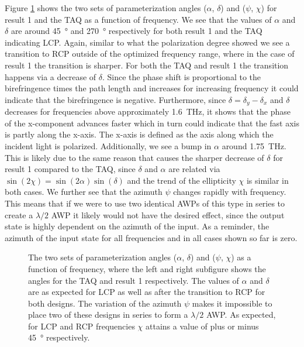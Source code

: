 Figure \ref{fig:cl4_params} shows the two sets of parameterization angles ($\alpha$, $\delta$) and ($\psi$, $\chi$) for result 1 and the TAQ as a function of frequency. We see that the values of $\alpha$ and $\delta$ are around \SI{45}{\degree} and \SI{270}{\degree} respectively for both result 1 and the TAQ indicating LCP. Again, similar to what the polarization degree showed we see a transition to RCP outside of the optimized frequency range, where in the case of result 1 the transition is sharper. For both the TAQ and result 1 the transition happens via a decrease of $\delta$. Since the phase shift is proportional to the birefringence times the path length and increases for increasing frequency it could indicate that the birefringence is negative. Furthermore, since $\delta = \delta_y - \delta_x$ and $\delta$ decreases for frequencies above approximately \SI{1.6}{\tera \hertz}, it shows that the phase of the x-component advances faster which in turn could indicate that the fast axis is partly along the x-axis. The x-axis is defined as the axis along which the incident light is polarized. Additionally, we see a bump in $\alpha$ around \SI{1.75}{\tera \hertz}. This is likely due to the same reason that causes the sharper decrease of $\delta$ for result 1 compared to the TAQ, since $\delta$ and $\alpha$ are related via $\sin(2\chi)=\sin(2\alpha)\sin(\delta)$ and the trend of the ellipticity $\chi$ is similar in both cases. We further see that the azimuth $\psi$ changes rapidly with frequency. This means that if we were to use two identical AWPs of this type in series to create a $\lambda/2$ AWP it likely would not have the desired effect, since the output state is highly dependent on the azimuth of the input. As a reminder, the azimuth of the input state for all frequencies and in all cases shown so far is zero.

\begin{figure}[ht]
    \centering
    
    \caption{The two sets of parameterization angles ($\alpha$, $\delta$) and ($\psi$, $\chi$) as a function of frequency, where the left and right subfigure shows the angles for the TAQ and result 1 respectively. The values of $\alpha$ and $\delta$ are as expected for LCP as well as after the transition to RCP for both designs. The variation of the azimuth $\psi$ makes it impossible to place two of these designs in series to form a $\lambda/2$ AWP. As expected, for LCP and RCP frequencies $\chi$ attains a value of plus or minus \SI{45}{\degree} respectively.}
    \label{fig:cl4_params}
\end{figure}

